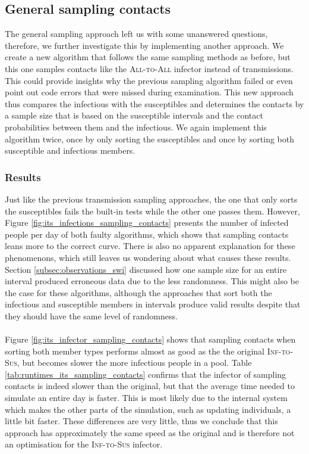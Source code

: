 \subsection{General sampling contacts}
The general sampling approach left us with some unanswered questions, therefore, we further investigate this by implementing another approach. We create a new algorithm that follows the same sampling methods as before, but this one samples contacts like the \textsc{All-to-All} infector instead of transmissions. This could provide insights why the previous sampling algorithm failed or even point out code errors that were missed during examination. This new approach thus compares the infectious with the susceptibles and determines the contacts by a sample size that is based on the susceptible intervals and the contact probabilities between them and the infectious. We again implement this algorithm twice, once by only sorting the susceptibles and once by sorting both susceptible and infectious members.

\subsubsection{Results}
Just like the previous transmission sampling approaches, the one that only sorts the susceptibles fails the built-in tests while the other one passes them. However, Figure \ref{fig:its_infections_sampling_contacts} presents the number of infected people per day of both faulty algorithms, which shows that sampling contacts leans more to the correct curve. There is also no apparent explanation for these phenomenons, which still leaves us wondering about what causes these results. Section \ref{subsec:observations_swi} discussed how one sample size for an entire interval produced erroneous data due to the less randomness. This might also be the case for these algorithms, although the approaches that sort both the infectious and susceptible members in intervals produce valid results despite that they should have the same level of randomness.
\\\\
Figure \ref{fig:its_infector_sampling_contacts} shows that sampling contacts when sorting both member types performs almost as good as the the original \textsc{Inf-to-Sus}, but becomes slower the more infectious people in a pool. Table \ref{tab:runtimes_its_sampling_contacts} confirms that the infector of sampling contacts is indeed slower than the original, but that the average time needed to simulate an entire day is faster. This is most likely due to the internal system which makes the other parts of the simulation, such as updating individuals, a little bit faster. These differences are very little, thus we conclude that this approach has approximately the same speed as the original and is therefore not an optimisation for the \textsc{Inf-to-Sus} infector.

